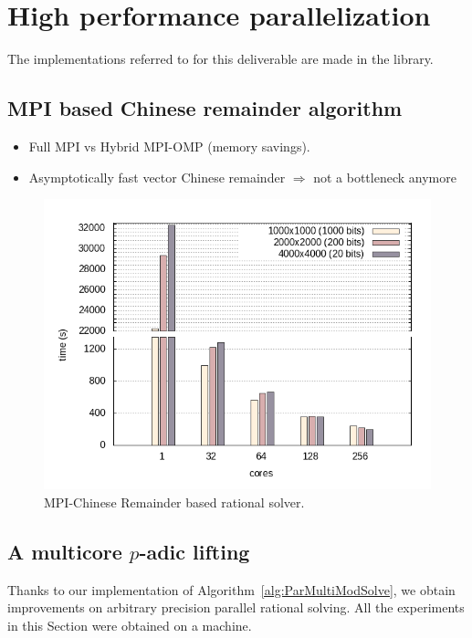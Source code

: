 \section{High performance parallelization}

The implementations referred to for this deliverable are made in the \Linbox library.


\subsection{MPI based Chinese remainder algorithm}

\begin{itemize}
\item  Full MPI vs Hybrid MPI-OMP (memory savings).
\item Asymptotically fast vector Chinese remainder $\Rightarrow$ not a bottleneck anymore
\end{itemize}



\begin{figure}[htb]
\begin{center}
  \includegraphics[width=.8\textwidth]{nodes_histogram}
\end{center}
\caption{MPI-Chinese Remainder based rational solver.}\label{fig:mpi_histo}
\end{figure}
\subsection{A multicore $p$-adic lifting}
Thanks to our implementation of Algorithm~\ref{alg:ParMultiModSolve},
we obtain improvements on arbitrary precision parallel rational
solving.
All the experiments in this Section were obtained on a 
machine.


